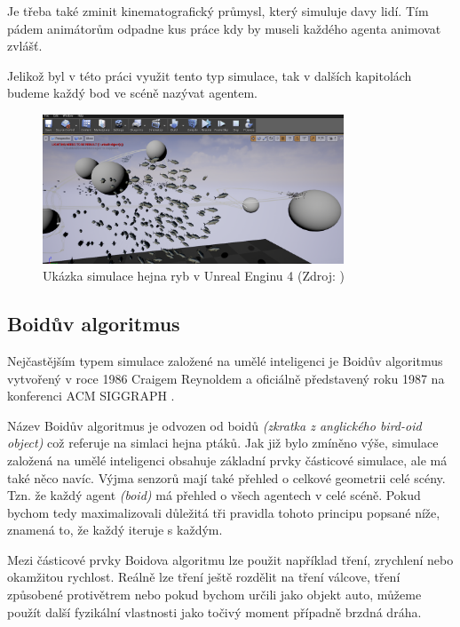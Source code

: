\documentclass[czech,public,dept460,male,cpdeclaration]{diploma}
\begin{document}
Je třeba také zminit kinematografický průmysl, který simuluje davy lidí. Tím pádem animátorům odpadne kus práce kdy by museli každého agenta animovat zvlášť.

Jelikož byl v této práci využit tento typ simulace, tak v dalších kapitolách budeme každý bod ve scéně nazývat agentem.

\begin{figure}\centering\includegraphics[width=0.8\textwidth]{Figures/flock_fish.png}
	\caption{
		Ukázka simulace hejna ryb v Unreal Enginu 4 (Zdroj: \cite{linkToUnrealEngineFish})
	}
\end{figure}

\subsection{Boidův algoritmus}

Nejčastějším typem simulace založené na umělé inteligenci je Boidův algoritmus  vytvořený v roce 1986 Craigem Reynoldem a oficiálně představený roku 1987 na konferenci ACM SIGGRAPH \cite{linkToACM, linkToSIGGRAPH}.

Název Boidův algoritmus je odvozen od boidů \textit{(zkratka z anglického bird-oid object)} což referuje na simlaci hejna ptáků. Jak již bylo zmíněno výše, simulace založená na
umělé inteligenci obsahuje základní prvky částicové simulace, ale má také něco navíc. Výjma senzorů mají také přehled o celkové geometrii celé scény. Tzn. že každý agent \textit{(boid)} má přehled o všech agentech v celé scéně. Pokud bychom tedy maximalizovali důležitá tři pravidla tohoto principu popsané níže, znamená to, že každý iteruje s každým.

Mezi částicové prvky Boidova algoritmu lze použit například tření, zrychlení nebo okamžitou rychlost. Reálně lze tření ještě rozdělit na tření válcove, tření způsobené protivětrem nebo pokud bychom určili jako objekt auto, můžeme použít další fyzikální vlastnosti jako točivý moment případně brzdná dráha.
\end{document}
